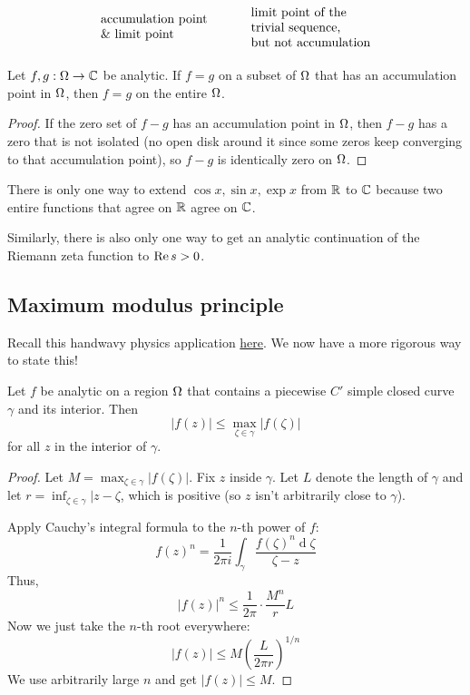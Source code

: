 \documentclass[12pt]{article}
\renewcommand{\d}{\ensuremath{\operatorname{d}}}
\begin{document}
\[\begin{tikzpicture}[x=0.75pt,y=0.75pt,yscale=-1,xscale=1]
    \draw (35,202) node [anchor=north west][inner sep=0.75pt]   [align=left] {accumulation point \\\& limit point};
    \draw (193,195) node [anchor=north west][inner sep=0.75pt]   [align=left] {limit point of the \\trivial sequence, \\but not accumulation};
    
    
    \end{tikzpicture}
    \]

\begin{theorem}
    Let $f,g:\Omega\to \mathbb{C}$ be analytic. If $f=g$ on a subset of $\Omega$ that has an accumulation point in $\Omega$, then $f=g$ on the entire $\Omega$.
\end{theorem}
\begin{proof}
    If the zero set of $f-g$ has an accumulation point in $\Omega$, then $f-g$ has a zero that is not isolated (no open disk around it since some zeros keep converging to that accumulation point), so $f-g$ is identically zero on $\Omega$.
\end{proof}

\eg There is only one way to extend $\cos x, \sin x, \exp x$ from $\mathbb{R}$ to $\mathbb{C}$ because two entire functions that agree on $\mathbb{R}$ agree on $\mathbb{C}$. 

\eg Similarly, there is also only one way to get an analytic continuation of the Riemann zeta function to $\operatorname{Re} s>0$. 

\subsection{Maximum modulus principle}
Recall this handwavy physics application \hyperlink{physics}{here}. We now have a more rigorous way to state this!

\begin{theorem}
    Let $f$ be analytic on a region $\Omega$ that contains a piecewise $C'$ simple closed curve $\gamma$ and its interior. Then \[|f(z)|\leq \max_{\zeta\in \gamma}|f(\zeta)|\] for all $z$ in the interior of $\gamma$.
\end{theorem}
\begin{proof}
    Let $M= \max_{\zeta\in \gamma}|f(\zeta)|$. Fix $z$ inside $\gamma$. Let $L$ denote the length of $\gamma$ and let $r=\inf_{\zeta\in \gamma}|z-\zeta$, which is positive (so $z$ isn't arbitrarily close to $\gamma$). 

    Apply Cauchy's integral formula to the $n$-th power of $f$: \[f(z)^n = \frac{1}{2\pi i}\int_{\gamma}\frac{f(\zeta)^n\d\zeta}{\zeta-z}\]
    Thus, \[|f(z)|^n \leq \frac{1}{2\pi}\cdot \frac{M^n}{r}L\]
    Now we just take the $n$-th root everywhere:\[|f(z)|\leq M\left(\frac{L}{2\pi r}\right)^{1/n}\] We use arbitrarily large $n$ and get $|f(z)|\leq M$.
\end{proof}
\end{document}
